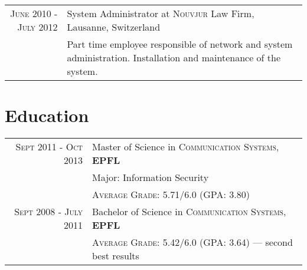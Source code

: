 \documentclass[a4paper,10pt]{article} %
\newcommand\Bot{\rule[-1.2ex]{0pt}{0pt}} %
\begin{document}
\begin{tabular}{r|p{11cm}}

\textsc{June 2010 - July 2012} & System Administrator at \textsc{Nouvjur} Law Firm, Lausanne, Switzerland \emph{}\\
& \footnotesize{Part time employee responsible of network and system
administration. Installation and maintenance of the system.}
\end{tabular}


\section{Education}

\begin{tabular}{rl}	
\textsc{Sept 2011 - Oct 2013} & Master of Science in \textsc{Communication Systems}, \textbf{EPFL}\\
                              & Major: Information Security\\
                              &\normalsize \textsc{Average Grade}: 5.71/6.0
    (GPA: 3.80) \Bot\\


\textsc{Sept 2008 - July 2011} & Bachelor of Science in \textsc{Communication Systems}, \textbf{EPFL} \\
                               &\normalsize \textsc{Average Grade}: 5.42/6.0
    (GPA: 3.64) --- second best results \Bot\\



\end{tabular}
\end{document}
